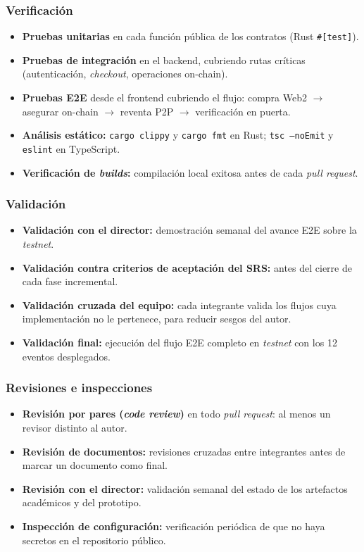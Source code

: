 \documentclass[12pt,oneside]{report}
\begin{document}
      \subsubsection{Verificación}
      \begin{itemize}
        \item \textbf{Pruebas unitarias} en cada función pública de los contratos (Rust \texttt{\#[test]}).
        \item \textbf{Pruebas de integración} en el backend, cubriendo rutas críticas (autenticación, \textit{checkout}, operaciones on-chain).
        \item \textbf{Pruebas E2E} desde el frontend cubriendo el flujo: compra Web2 $\rightarrow$ asegurar on-chain $\rightarrow$ reventa P2P $\rightarrow$ verificación en puerta.
        \item \textbf{Análisis estático:} \texttt{cargo clippy} y \texttt{cargo fmt} en Rust; \texttt{tsc --noEmit} y \texttt{eslint} en TypeScript.
        \item \textbf{Verificación de \textit{builds}:} compilación local exitosa antes de cada \textit{pull request}.
      \end{itemize}

      \subsubsection{Validación}
      \begin{itemize}
        \item \textbf{Validación con el director:} demostración semanal del avance E2E sobre la \textit{testnet}.
        \item \textbf{Validación contra criterios de aceptación del SRS:} antes del cierre de cada fase incremental.
        \item \textbf{Validación cruzada del equipo:} cada integrante valida los flujos cuya implementación no le pertenece, para reducir sesgos del autor.
        \item \textbf{Validación final:} ejecución del flujo E2E completo en \textit{testnet} con los 12 eventos desplegados.
      \end{itemize}

      \subsubsection{Revisiones e inspecciones}
      \begin{itemize}
        \item \textbf{Revisión por pares (\textit{code review})} en todo \textit{pull request}: al menos un revisor distinto al autor.
        \item \textbf{Revisión de documentos:} revisiones cruzadas entre integrantes antes de marcar un documento como final.
        \item \textbf{Revisión con el director:} validación semanal del estado de los artefactos académicos y del prototipo.
        \item \textbf{Inspección de configuración:} verificación periódica de que no haya secretos en el repositorio público.
      \end{itemize}
\end{document}
